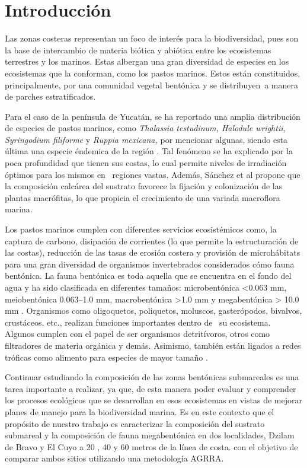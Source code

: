 \documentclass[
  authoryear,
  preprint,
  3p,
  twocolumn]{elsarticle}
\begin{document}
\hypertarget{introducciuxf3n}{%
\section{Introducción}\label{introducciuxf3n}}

Las zonas costeras representan un foco de interés para la biodiversidad,
pues son la base de intercambio de materia biótica y abiótica entre los
ecosistemas terrestres y los marinos. Estas albergan una gran diversidad
de especies en los ecosistemas que la conforman, como los pastos
marinos. Estos están constituidos, principalmente, por una comunidad
vegetal bentónica \citep{herrera2019pastos} y se distribuyen~a manera de
parches estratificados.

Para el caso de la península de Yucatán, se ha reportado una amplia
distribución de especies de pastos marinos, como \emph{Thalassia
testudinum, Halodule wrightii}, \emph{Syringodium filiforme} y
\emph{Ruppia mexicana,} por mencionar algunas, siendo esta última una
especie éndemica de la región \citep{unknown}. Tal fenómeno se ha
explicado por la poca profundidad que tienen sus costas, lo cual permite
niveles de irradiación óptimos para los mismos en~ regiones vastas.
Además, Sánchez et al \citep{sanchez2007analisis} propone que la
composición calcárea del sustrato favorece la fijación y colonización de
las plantas macrófitas, lo que propicia el crecimiento de una variada
macroflora marina.

Los pastos marinos cumplen con diferentes servicios ecosistémicos como,
la captura de carbono, disipación de corrientes (lo que permite la
estructuración de las costas), reducción de las tasas de erosión costera
\citep{herrera2019pastos} y provisión de microhábitats para una gran
diversidad de organismos invertebrados considerados cómo fauna
bentónica. La fauna bentónica es toda aquella que se encuentra en el
fondo del agua y ha sido clasificada en diferentes tamaños:
microbentónica \textless0.063 mm, meiobentónica 0.063--1.0 mm,
macrobentónica \textgreater1.0 mm y megabentónica \textgreater{} 10.0 mm
\citep{tagliapietra2010benthic}. Organismos como oligoquetos,
poliquetos, moluscos, gasterópodos, bivalvos, crustáceos, etc., realizan
funciones importantes dentro de~ su ecosistema.~ Algunos cumplen con el
papel de ser organismos detritívoros, otros como filtradores de materia
orgánica y demás. Asimismo, también están ligados a redes tróficas como
alimento para especies de mayor tamaño \citep{tagliapietra2010benthic}.

Continuar estudiando la composición de las zonas bentónicas submareales
es una tarea importante a realizar, ya que, de esta manera poder evaluar
y comprender los procesos ecológicos que se desarrollan en esos
ecosistemas en vistas de mejorar planes de manejo para la biodiversidad
marina. Es en este contexto que el propósito de nuestro trabajo es
caracterizar la composición del sustrato submareal y la composición de
fauna megabentónica en dos localidades, Dzilam de Bravo y El Cuyo a 20 ,
40 y 60 metros de la línea de costa. con el objetivo de comparar ambos
sitios utilizando una metodología AGRRA.
\end{document}
